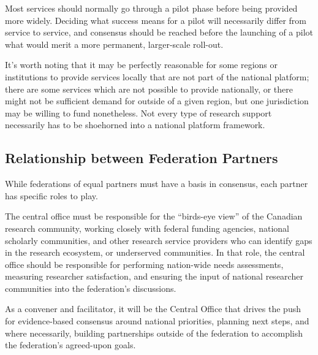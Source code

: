 \documentclass[11pt, letterpaper, twoside]{article}
\begin{document}
Most services should normally go through a pilot phase before being
provided more widely.  Deciding what success means for a pilot will
necessarily differ from service to service, and consensus should be
reached before the launching of a pilot what would merit a more
permanent, larger-scale roll-out.

It's worth noting that it may be perfectly reasonable for some regions
or institutions to provide services locally that are not part of the
national platform; there are some services which are not possible to
provide nationally, or there might not be sufficient demand for outside
of a given region, but one jurisdiction may be willing to fund
nonetheless. Not every type of research support necessarily has to be
shoehorned into a national platform framework.

\subsection*{Relationship between Federation Partners}
%

While federations of equal partners must have a basis in consensus, each
partner has specific roles to play.


The central office must be responsible for the ``birds-eye view'' of the
Canadian research community, working closely with federal funding
agencies, national scholarly communities, and other research service
providers who can identify gaps in the research ecosystem, or
underserved communities.  In that role, the central office should be
responsible for performing nation-wide needs assessments, measuring
researcher satisfaction, and ensuring the input of national researcher
communities into the federation's discussions.


As a convener and facilitator, it will be the Central Office that drives
the push for evidence-based consensus around national priorities,
planning next steps, and where necessarily, building partnerships
outside of the federation to accomplish the federation's agreed-upon
goals.

\end{document}
